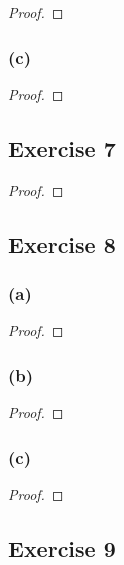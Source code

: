 \documentclass[14pt]{extarticle}
\begin{document}
\begin{proof}

\end{proof}

\subsubsection{(c)}

\begin{proof}

\end{proof}

\subsection{Exercise 7}

\begin{proof}

\end{proof}

\subsection{Exercise 8}

\subsubsection{(a)}

\begin{proof}

\end{proof}

\subsubsection{(b)}

\begin{proof}

\end{proof}

\subsubsection{(c)}

\begin{proof}

\end{proof}

\subsection{Exercise 9}
\end{document}
